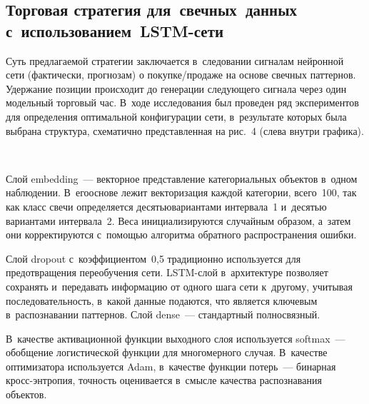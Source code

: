 {\begin{multicols}{2}
\vspace*{-6pt}
  
\section{Торговая стратегия для~свечных~данных с~использованием~LSTM-сети}

\vspace*{-3pt}

  Суть предлагаемой стратегии заключается в~следовании сигналам нейронной сети 
(фактически, прогнозам) о по\-куп\-ке/про\-да\-же на основе свечных паттернов. Удержание 
позиции происходит до генерации следующего сигнала через один модельный торговый час. 
В~ходе исследования был проведен ряд экспериментов для определения оптимальной 
конфигурации сети, в~результате которых была выбрана структура, схематично 
представленная на рис.~4 (слева внутри графика).
  
   \begin{figure*} %
   \vspace*{1pt}
  \begin{center}  
    \mbox{%
\epsfxsize=162.4mm
}

\end{center}
\vspace*{-6pt}
   \end{figure*}
   
  Слой embedding~--- векторное представление категориальных объектов в~одном 
наблюдении. В~его\linebreak основе лежит векторизация каждой категории, всего~100, так как 
класс свечи определяется де\-сятью\linebreak вариантами интервала~1 и~де\-сятью вариантами 
интервала~2. Веса инициализируются случайным образом, а~затем они корректируются 
с~по\-мощью алгоритма обратного распространения ошибки.

 Слой dropout с~коэффициентом~0,5 
традиционно используется для предотвращения пе\-ре\-обуче\-ния сети. LSTM-слой 
в~архитектуре позволяет сохранять и~передавать информацию от одного шага сети 
к~другому, учитывая последовательность, в~какой данные подаются, что является ключевым 
в~распознавании паттернов. 
Слой dense~--- стандартный полносвязный. 

В~качестве 
активационной функции выходного слоя используется softmax~--- обобщение логистической 
функции для многомерного случая. В~качестве оптимизатора используется Adam, в~качестве 
функции потерь~--- бинарная кросс-энт\-ро\-пия, точ\-ность оценивается в~смысле качества 
распознавания объектов. 


\end{multicols}}
